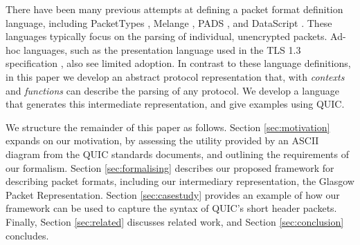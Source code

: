 \documentclass[10pt,sigconf]{acmart}
\begin{document}

There have been many previous attempts at defining a packet format definition language,
including PacketTypes \cite{mccann2000packet}, Melange \cite{madhavapeddy2007melange},
PADS \cite{fisher2005pads}, and DataScript \cite{back2002datascript}. These languages
typically focus on the parsing of individual, unencrypted packets. Ad-hoc languages, such
as the presentation language used in the TLS 1.3 specification
\cite{draft-ietf-tls-tls13-28}, also see limited adoption. In contrast to these language
definitions, in this paper we develop an abstract protocol representation that, with
\emph{contexts} and \emph{functions} can describe the parsing of any protocol. We develop
a language that generates this intermediate representation, and give examples using QUIC.


We structure the remainder of this paper as follows. Section \ref{sec:motivation} expands
on our motivation, by assessing the utility provided by an ASCII diagram from the QUIC
standards documents, and outlining the requirements of our formalism. Section
\ref{sec:formalising} describes our proposed framework for describing packet formats,
including our intermediary representation, the Glasgow Packet Representation. Section
\ref{sec:casestudy} provides an example of how our framework can be used to capture
the syntax of QUIC's short header packets. Finally, Section \ref{sec:related} discusses
related work, and Section \ref{sec:conclusion} concludes.

%
%
\end{document}
